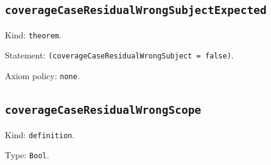 \documentclass[11pt]{article}
\begin{document}
\subsection*{\texttt{coverageCaseResidualWrongSubjectExpected}}
\noindent Kind: \texttt{theorem}.\par
\noindent Statement: \texttt{(coverageCaseResidualWrongSubject = false)}.\par
\noindent Axiom policy: \texttt{none}.\par
\subsection*{\texttt{coverageCaseResidualWrongScope}}
\noindent Kind: \texttt{definition}.\par
\noindent Type: \texttt{Bool}.\par
\end{document}
